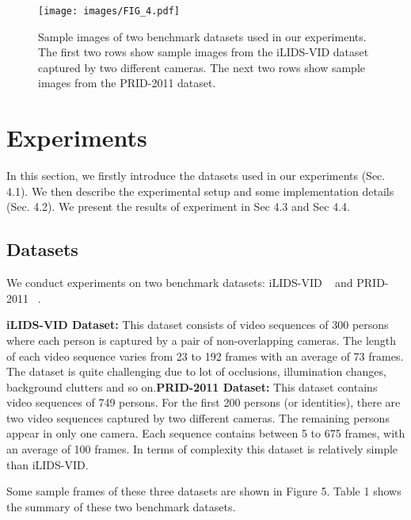 \documentclass[sigconf, authordraft,review=false]{acmart}
\begin{document}
\begin{figure*}
\texttt{[image: images/FIG\_4.pdf]}
\caption{Sample images of two benchmark datasets used in our
experiments.   The  first  two  rows  show  sample  images  from  the
iLIDS-VID dataset captured by two different cameras.  The next
two rows show sample images from the PRID-2011 dataset.}
\end{figure*}\section{Experiments}
In this section, we firstly introduce the datasets used in
our experiments (Sec. 4.1).   We then describe the experimental setup and some implementation details (Sec. 4.2).
We present the results of experiment in Sec 4.3 and Sec 4.4.
\subsection{Datasets}
We  conduct  experiments  on  two  benchmark  datasets:
iLIDS-VID ~\cite{wang14_eccv} and PRID-2011 ~\cite{hirzer11_scia}. 

\textbf{iLIDS-VID Dataset:}
This dataset consists of video sequences of 300 persons where each person is captured by a pair of non-overlapping cameras.  The length of each video sequence varies from 23 to 192 frames with an average of 73 frames. The dataset is quite challenging due to lot of occlusions, illumination changes, background clutters and so
on.\newline\textbf{PRID-2011  Dataset:
}This  dataset  contains  video  sequences of 749 persons.  For the first 200 persons (or identities), there are two video sequences captured by two different cameras.  The remaining persons appear in only one camera.  Each sequence contains between 5 to 675 frames,
with an average of 100 frames. In terms of complexity this
dataset is relatively simple than iLIDS-VID.

Some sample frames of these three datasets are shown in
Figure 5. Table 1 shows the summary of these two benchmark datasets.
\end{document}
